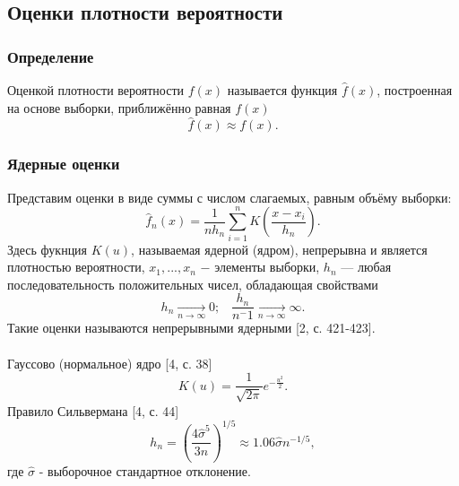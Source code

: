	\subsection{Оценки плотности вероятности}
	\subsubsection{Определение}
	\noindent Оценкой плотности вероятности $f(x)$ называется функция $\widehat{f}(x)$, построенная на основе выборки, приближённо равная $f(x)$
    \begin{equation}
        \widehat{f}(x)\approx f(x).
    \end{equation}
	\subsubsection{Ядерные оценки}
	\noindent Представим оценки в виде суммы с числом слагаемых, равным объёму выборки:\begin{equation}
        \widehat{f}_n(x)=\frac{1}{n h_n}\sum_{i=1}^n K\left(\frac{x-x_i}{h_n}\right).
    \end{equation}
    Здесь фукнция $K(u)$, называемая ядерной (ядром), непрерывна и является плотностью вероятности, $x_1,...,x_n$ $-$ элементы выборки, ${h_n}$ — любая последовательность положительных чисел, обладающая свойствами
    \begin{equation}
        h_n\xrightarrow[n\to\infty]{}0;\;\;\;\frac{h_n}{n^-1} \xrightarrow[n\to\infty]{}\infty.
    \end{equation}
    Такие оценки называются непрерывными ядерными [2, с. 421-423].\\\\
    Гауссово (нормальное) ядро [4, с. 38]
    \begin{equation}
        K(u)=\frac{1}{\sqrt{2\pi}}e^{-\frac{u^2}{2}}.
    \end{equation}
    Правило Сильвермана [4, с. 44]
    \begin{equation}
        h_n=\left(\frac{4\hat{\sigma}^5}{3n}\right)^{1/5}\approx1.06\hat{\sigma}n^{-1/5},
    \end{equation}
    где $\hat{\sigma}$ - выборочное стандартное отклонение.